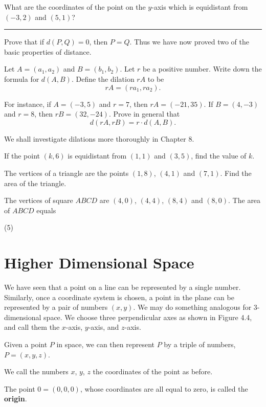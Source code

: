 \documentclass[12pt]{book} %
\begin{document}
\begin{ExerciseList}
\Exercise What are the coordinates of the point on the $y$-axis which is equidistant from $(-3,2)$ and $(5,1)$? \rule{2.5cm}{0.4pt}

\Exercise Prove that if $d(P,Q)=0$, then $P=Q$. Thus we have now proved two of the basic properties of distance.

\Exercise Let $A=(a_1,a_2)$ and $B=(b_1,b_2)$. Let $r$ be a positive number. Write down the formula for $d(A,B)$. Define the dilation $rA$ to be
\[
rA=(ra_1,ra_2).
\]

For instance, if $A=(-3,5)$ and $r=7$, then $rA=(-21,35)$. If $B=(4,-3)$ and $r=8$, then $rB=(32,-24)$. Prove in general that
\[
d(rA,rB)=r\cdot d(A,B).
\]

We shall investigate dilations more thoroughly in Chapter 8.

\Exercise If the point $(k,6)$ is equidistant from $(1,1)$ and $(3,5)$, find the value of $k$.

\Exercise The vertices of a triangle are the points $(1,8)$, $(4,1)$ and $(7,1)$. Find the area of the triangle.

\Exercise The vertices of square $ABCD$ are $(4,0)$, $(4,4)$, $(8,4)$ and $(8,0)$. The area of $ABCD$ equals
\begin{tasks}(5)
\end{tasks}
\end{ExerciseList}

\section{Higher Dimensional Space}

We have seen that a point on a line can be represented by a single number. Similarly, once a coordinate system is chosen, a point in the plane can be represented by a pair of numbers $(x,y)$. We may do something analogous for 3-dimensional space. We choose three perpendicular axes as shown in Figure 4.4, and call them the $x$-axis, $y$-axis, and $z$-axis.


Given a point $P$ in space, we can then represent $P$ by a triple of numbers, $P=(x,y,z)$.


We call the numbers $x$, $y$, $z$ the coordinates of the point as before.

The point $0=(0,0,0)$, whose coordinates are all equal to zero, is called the \textbf{origin}.
\end{document}
